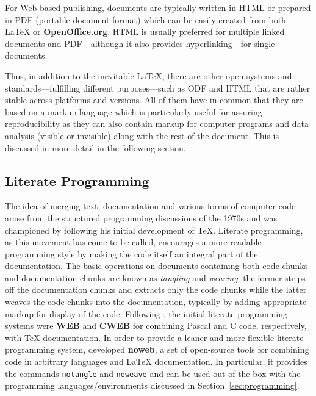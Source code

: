\documentclass[10pt,a4paper,twoside]{article}
\let\code=\texttt
\let\pkg=\textbf
\let\proglang=\textsf
\begin{document}
For Web-based publishing, documents are typically written in \proglang{HTML}
\citep[hypertext markup language, \url{http://www.w3.org/}, see][]{repro:Raggett+LeHors+Jacobs:1999}
or prepared in PDF (portable document format) which can be easily created from both
{\LaTeX} or \pkg{OpenOffice.org}. \proglang{HTML} is usually preferred for multiple
linked documents and PDF---although it also provides hyperlinking---for single
documents.

Thus, in addition to the inevitable {\LaTeX}, there are other open systems and
standards---fulfilling different purposes---such as ODF and \proglang{HTML} that
are rather stable across platforms and versions. All of them have in common that
they are based on a markup language which is particularly useful for assuring
reproducibility as they can also contain markup for computer programs and data
analysis (visible or invisible) along with the rest of the document. This is discussed
in more detail in the following section.


\subsection{Literate Programming} \label{sec:literate}

The idea of merging text, documentation and various forms of computer code
arose from the structured programming discussions of the 1970s and was
championed by \cite{repro:Knuth:1992} following his initial development of
{\TeX}.  Literate programming, as this movement has come to be called, 
encourages a more readable programming style by making the code itself an
integral part of the documentation. The basic operations on documents 
containing both code chunks and documentation chunks are known as \emph{tangling} and
\emph{weaving}: the former strips off the documentation chunks and extracts only
the code chunks while the latter weaves the code chunks into the documentation,
typically by adding appropriate markup for display of the code. Following
\cite{repro:Knuth:1992}, the initial literate programming systems were
\pkg{WEB} and \pkg{CWEB} for combining \proglang{Pascal} and \proglang{C}
code, respectively, with {\TeX} documentation. In order to provide a leaner
and more flexible literate programming system, \cite{repro:Ramsey:1994}
developed \pkg{noweb}, a set of open-source tools for combining code in
arbitrary languages and {\LaTeX} documentation. In particular, it provides
the commands \code{notangle} and \code{noweave} and can be used out of the box
with the programming languages/environments discussed in Section~\ref{sec:programming}.
\end{document}
